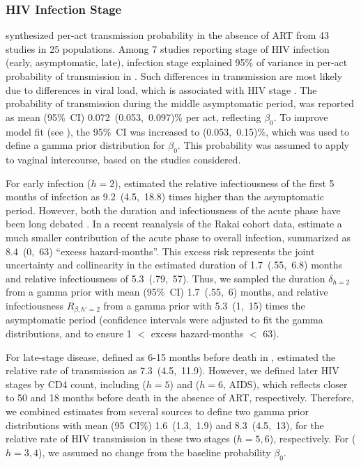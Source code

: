 \subsubsection{HIV Infection Stage}\label{mod.par.beta.hiv}
\citet{Boily2009} synthesized per-act transmission probability in the absence of ART
from 43 studies in 25 populations.
Among 7 studies reporting stage of HIV infection (early, asymptomatic, late),
infection stage explained 95\% of variance
in per-act probability of transmission in \cite{Boily2009}.
Such differences in transmission are most likely due to differences in viral load,
which is associated with HIV stage \cite{Saag1996,Donnell2010}.
The probability of transmission during the middle asymptomatic period,
was reported as mean (95\%~CI) 0.072~(0.053,~0.097)\% per act, reflecting $\beta_0$.
To improve model fit (see ), the 95\%~CI was increased to (0.053,~0.15)\%,
which was used to define a gamma prior distribution for $\beta_0$.
This probability was assumed to apply to vaginal intercourse,
based on the studies considered.
\par
For early infection ($h=2$), \citet{Boily2009} estimated
the relative infectiousness of the first 5 months of infection
as 9.2~(4.5,~18.8) times higher than the asymptomatic period.
However, both the duration and infectiousness of the acute phase
have been long debated \cite{Hollingsworth2008,Cohen2011ahi,Cohen2012}.
In a recent reanalysis of the Rakai cohort data, \citet{Bellan2015ahi} estimate
a much smaller contribution of the acute phase to overall infection,
summarized as 8.4~(0,~63) ``excess hazard-months''.
This excess risk represents the joint uncertainty and collinearity in the estimated
duration of 1.7~(.55,~6.8) months and relative infectiousness of 5.3~(.79,~57).
Thus, we sampled the duration $\delta_{h=2}$ from
a gamma prior with mean (95\%~CI) 1.7~(.55,~6) months,
and relative infectiousness $R_{\beta,h'=2}$ from
a gamma prior with 5.3~(1,~15) times the asymptomatic period
(confidence intervals were adjusted to fit the gamma distributions,
and to ensure 1 $<$ excess hazard-months $<$ 63).
\par
For late-stage disease, defined as 6-15 months before death in \cite{Boily2009},
\citeauthor{Boily2009} estimated the relative rate of transmission as 7.3~(4.5,~11.9).
However, we defined later HIV stages by CD4 count, including
 ($h=5$) and  ($h=6$, AIDS),
which reflects closer to 50 and 18 months before death in the absence of ART, respectively.
Therefore, we combined estimates from several sources
\cite{Wawer2005,Boily2009,Donnell2010} to define two gamma prior distributions
with mean (95~CI\%) 1.6~(1.3,~1.9) and 8.3~(4.5,~13),
for the relative rate of HIV transmission in these two stages ($h=5,6$), respectively.
For  ($h=3,4$), we assumed no change from the baseline probability $\beta_0$.
